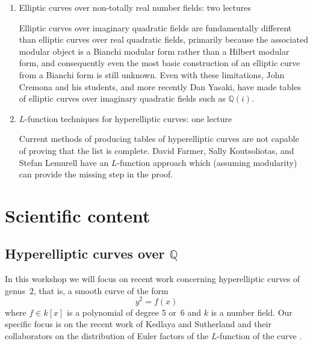 \documentclass[12pt]{amsart}
\numberwithin{equation}{section}
\newcommand{\Q}{\mathbb Q}
\begin{document}
\begin{enumerate}


\item  Elliptic curves over non-totally real number fields: two lectures

\noindent
Elliptic curves over imaginary quadratic fields are fundamentally
different than elliptic curves over real quadratic fields, primarily
because the associated modular object is a Bianchi modular form
rather than a Hilbert modular form, and consequently even the
most basic construction of an elliptic curve from a Bianchi form is
still unknown.  Even with these limitations, John Cremona and his
students, and more recently Dan Yasaki, have made tables of elliptic curves
over imaginary quadratic fields such as $\Q(i)$.


\item  $L$-function techniques for hyperelliptic curves: one lecture

\noindent
Current methods of producing tables of hyperelliptic curves are not
capable of proving that the list is complete.  David Farmer, Sally
Koutsoliotas, and Stefan Lemurell have an $L$-function approach which
(assuming modularity) can provide the missing step in the proof.

\end{enumerate}

\section{Scientific content}

\subsection{Hyperelliptic curves over $\Q$}

In this workshop we will focus on recent work concerning hyperelliptic 
curves
of genus~$2$, that is, a smooth curve of the form
\begin{equation}
y^2=f(x)
\end{equation}
where $f\in k[x]$ is a polynomial of degree 5 or~6 and $k$ is a number
field.  Our specific focus is on the recent work of Kedlaya and
Sutherland and their collaborators on the distribution of Euler
factors of the $L$-function of the curve
\cite{KS-1,kedlaya-sutherland-ants}.
\end{document}
